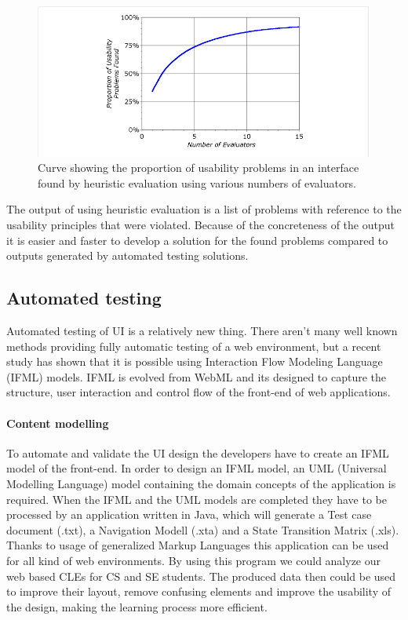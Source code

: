 \documentclass[10pt,english,a4paper]{article}
\begin{document}
\begin{figure}[tbh]
    \includegraphics[width=1\textwidth]{images/heuristic-results.png}
    \caption{Curve showing the proportion of usability problems in an interface
     found by heuristic evaluation using various numbers of evaluators\cite{a2020_heuristic}.}
     \label{fig:increase}
\end{figure}
The output of using heuristic evaluation is a list of problems with reference to the usability
principles that were violated\cite{a2020_heuristic}. Because of the concreteness of the output 
it is easier and faster to develop a solution for the found problems compared to outputs generated
by automated testing solutions. 



\subsection{Automated testing}
Automated testing of UI is a relatively new thing\cite{automated_testing_ifml}. There aren't many well known methods
providing fully automatic testing of a web environment, but a recent study has shown that
it is possible using Interaction Flow Modeling Language (IFML) models\cite{automated_testing_ifml}.
IFML is evolved from WebML and its designed to capture the structure, user interaction and control
flow of the front-end of web applications\cite{automated_testing_ifml}.


\paragraph{Content modelling}
To automate and validate the UI design the developers have to create an IFML model
of the front-end. In order to design an IFML model, an UML (Universal Modelling Language) model 
containing the domain concepts of the application is required\cite{automated_testing_ifml}. 
When the IFML and the UML models are completed they have to be processed by an application written 
in Java, which will generate a Test case document (.txt), a Navigation Modell (.xta) and a State Transition 
Matrix (.xls)\cite{automated_testing_ifml}. 
Thanks to usage of generalized Markup Languages this application can be used for all kind of web environments. 
By using this program we could analyze our web based CLEs for CS and SE students. 
The produced data then could be used to improve their layout, remove confusing elements and improve the usability of the design,
making the learning process more efficient.
\end{document}
